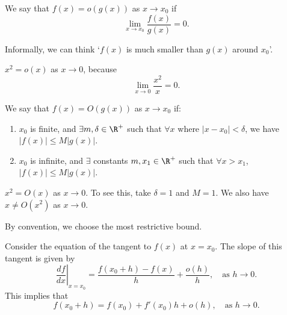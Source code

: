 \documentclass[a4]{scrartcl}
\begin{document}
\begin{definition}[Little-$o$]
	We say that $f(x) = o(g(x))$ as $x \rightarrow x_0$ if
	$$
\lim_{x \to x_0} \frac{f(x)}{g(x)} = 0.
	$$
\end{definition}

Informally, we can think `$f(x)$ is much smaller than $g(x)$ around $x_0$'.

\begin{example}
	$x^2 = o(x)$ as $x \rightarrow 0$, because
	$$
	\lim_{x \to 0} \frac{x^2}{x} = 0.
	$$
\end{example}

\begin{definition}[Big-$O$]
	We say that $f(x) = O(g(x))$ as $x \rightarrow x_0$ if:
	\begin{enumerate}[label=(\roman*)]
		\item $x_0$ is finite, and $\exists m , \delta \in \R^{+}$ such that $\forall x$ where $|x - x_0| < \delta$, we have $|f(x)| \leq M | g(x)|$.
		\item $x_0$ is infinite, and $\exists$ constants $m, x_1 \in \R^{+}$ such that $\forall x > x_1$, $|f(x)| \leq M |g(x)|$.
	\end{enumerate}
\end{definition}

\begin{example}
	$x^2 = O(x)$ as $x \rightarrow 0$. To see this, take $\delta = 1$ and $M = 1$. We also have $x \neq O(x^2)$ as $x \rightarrow 0$.
\end{example}

By convention, we choose the most restrictive bound.

Consider the equation of the tangent to $f(x)$ at $x = x_0$. The slope of this tangent is given by
$$
\left.\frac{d f}{d x}\right|_{x=x_0} = \frac{f(x_0 + h) - f(x)}{h} + \frac{o(h)}{h}, \quad \text{as } h \rightarrow 0. 
$$
This implies that
$$
f(x_0 + h) = f(x_0) + f'(x_0) h + o(h), \quad \text{as } h \rightarrow 0.
$$


\end{document}
